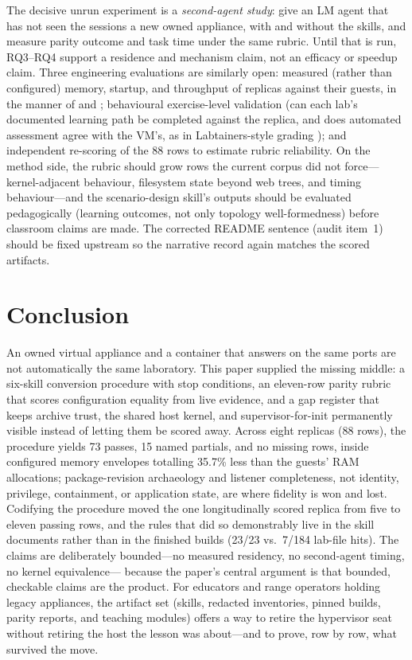 \documentclass[3p,twocolumn,authoryear]{elsarticle}
\begin{document}
The decisive unrun experiment is a \emph{second-agent study}: give an
LM agent that has not seen the sessions a new owned appliance, with
and without the skills, and measure parity outcome and task time under
the same rubric. Until that is run, RQ3--RQ4 support a residence and
mechanism claim, not an efficacy or speedup claim. Three engineering
evaluations are similarly open: measured (rather than configured)
memory, startup, and throughput of replicas against their guests, in
the manner of \citet{felter2015} and \citet{nakata2021}; behavioural
exercise-level validation (can each lab's documented learning path be
completed against the replica, and does automated assessment agree
with the VM's, as in Labtainers-style grading \citep{thompson2018});
and independent re-scoring of the 88 rows to estimate rubric
reliability. On the method side, the rubric should grow rows the
current corpus did not force---kernel-adjacent behaviour, filesystem
state beyond web trees, and timing behaviour---and the scenario-design
skill's outputs should be evaluated pedagogically (learning outcomes,
not only topology well-formedness) before classroom claims are made.
The corrected README sentence (audit item~1) should be fixed upstream
so the narrative record again matches the scored artifacts.

\section{Conclusion}
\label{sec:conclusion}

An owned virtual appliance and a container that answers on the same
ports are not automatically the same laboratory. This paper supplied
the missing middle: a six-skill conversion procedure with stop
conditions, an eleven-row parity rubric that scores configuration
equality from live evidence, and a gap register that keeps archive
trust, the shared host kernel, and supervisor-for-init permanently
visible instead of letting them be scored away. Across eight replicas
(88 rows), the procedure yields 73 passes, 15 named partials, and no
missing rows, inside configured memory envelopes totalling 35.7\% less
than the guests' RAM allocations; package-revision archaeology and
listener completeness, not identity, privilege, containment, or
application state, are where fidelity is won and lost. Codifying the
procedure moved the one longitudinally scored replica from five to
eleven passing rows, and the rules that did so demonstrably live in
the skill documents rather than in the finished builds (23/23 vs.\
7/184 lab-file hits). The claims are deliberately bounded---no
measured residency, no second-agent timing, no kernel equivalence---
because the paper's central argument is that bounded, checkable
claims are the product. For educators and range operators holding
legacy appliances, the artifact set (skills, redacted inventories,
pinned builds, parity reports, and teaching modules) offers a way to
retire the hypervisor seat without retiring the host the lesson was
about---and to prove, row by row, what survived the move.
\end{document}
